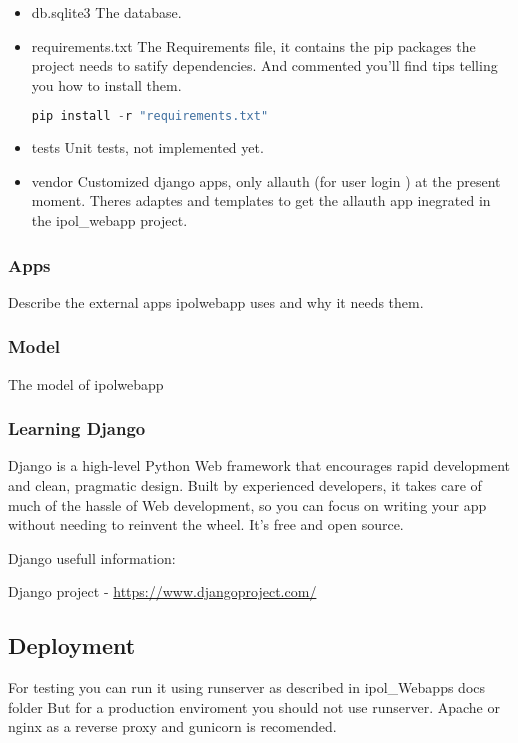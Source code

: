 \begin{itemize}
\item  db.sqlite3
The database.

\item  requirements.txt
The Requirements file, it contains the pip packages the project needs to satify dependencies. And commented you'll find tips telling you how to install them. 
\begin{lstlisting}[language=Python,firstnumber=1]
pip install -r "requirements.txt"
\end{lstlisting}

\item  tests
Unit tests, not implemented yet.

\item  vendor
Customized django apps, only allauth (for user login ) at the present moment. Theres adaptes and templates to get the allauth app inegrated in the ipol\_webapp project.

\end{itemize}


\subsubsection{Apps}
Describe the external apps ipolwebapp uses and why it needs them.

\subsubsection{Model}
The model of ipolwebapp

\subsubsection{Learning Django}
Django is a high-level Python Web framework that encourages rapid development and clean, pragmatic design. Built by experienced developers, it takes care of much of the hassle of Web development, so you can focus on writing your app without needing to reinvent the wheel. It’s free and open source.

Django usefull information:

Django project - \url{https://www.djangoproject.com/}

\subsection{Deployment}
For testing you can run it using runserver as described in ipol\_Webapps docs folder
But for a production enviroment you should not use runserver. Apache or nginx as a reverse proxy and gunicorn is recomended.

